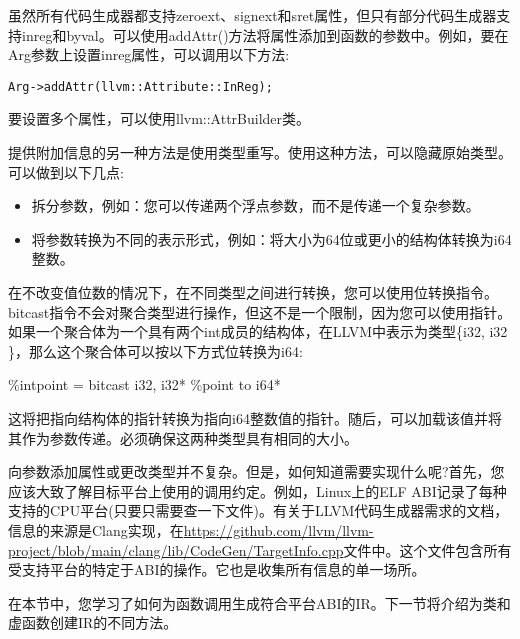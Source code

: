 虽然所有代码生成器都支持zeroext、signext和sret属性，但只有部分代码生成器支持inreg和byval。可以使用addAttr()方法将属性添加到函数的参数中。例如，要在Arg参数上设置inreg属性，可以调用以下方法:\par

\begin{lstlisting}[caption={}]
Arg->addAttr(llvm::Attribute::InReg);
\end{lstlisting}

要设置多个属性，可以使用llvm::AttrBuilder类。\par

提供附加信息的另一种方法是使用类型重写。使用这种方法，可以隐藏原始类型。可以做到以下几点:\par

\begin{itemize}
	\item 拆分参数，例如：您可以传递两个浮点参数，而不是传递一个复杂参数。
	\item 将参数转换为不同的表示形式，例如：将大小为64位或更小的结构体转换为i64整数。
\end{itemize}

在不改变值位数的情况下，在不同类型之间进行转换，您可以使用位转换指令。bitcast指令不会对聚合类型进行操作，但这不是一个限制，因为您可以使用指针。如果一个聚合体为一个具有两个int成员的结构体，在LLVM中表示为类型\{i32, i32 \}，那么这个聚合体可以按以下方式位转换为i64:\par

\begin{tcolorbox}[colback=white,colframe=black]
\%intpoint = bitcast { i32, i32}* \%point to i64*
\end{tcolorbox}

这将把指向结构体的指针转换为指向i64整数值的指针。随后，可以加载该值并将其作为参数传递。必须确保这两种类型具有相同的大小。\par

向参数添加属性或更改类型并不复杂。但是，如何知道需要实现什么呢?首先，您应该大致了解目标平台上使用的调用约定。例如，Linux上的ELF ABI记录了每种支持的CPU平台(只要只需要查一下文件)。有关于LLVM代码生成器需求的文档，信息的来源是Clang实现，在\url{https://github.com/llvm/llvm-project/blob/main/clang/lib/CodeGen/TargetInfo.cpp}文件中。这个文件包含所有受支持平台的特定于ABI的操作。它也是收集所有信息的单一场所。\par

在本节中，您学习了如何为函数调用生成符合平台ABI的IR。下一节将介绍为类和虚函数创建IR的不同方法。\par























